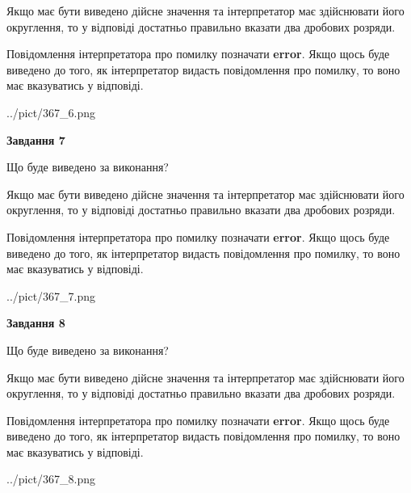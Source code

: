 \documentclass[12pt, ukrainian]{article}
\begin{document}
{\begin {Large}
Якщо має бути виведено дійсне значення та інтерпретатор має здійснювати його округлення, 
то у відповіді достатньо правильно вказати два дробових розряди.

Повідомлення інтерпретатора про помилку позначати \textbf{error}.
Якщо щось буде виведено до того, як інтерпретатор видасть повідомлення про помилку, 
то воно має вказуватись у відповіді. \par

\begin{center}
	{../pict/367_6.png}
\end{center}
\newpage

{\begin {center}\textbf{Завдання 7}\end {center}}\par
Що буде виведено за виконання? \par

Якщо має бути виведено дійсне значення та інтерпретатор має здійснювати його округлення, 
то у відповіді достатньо правильно вказати два дробових розряди.

Повідомлення інтерпретатора про помилку позначати \textbf{error}.
Якщо щось буде виведено до того, як інтерпретатор видасть повідомлення про помилку, 
то воно має вказуватись у відповіді. \par

\begin{center}
	{../pict/367_7.png}
\end{center}
\newpage

{\begin {center}\textbf{Завдання 8}\end {center}}\par
Що буде виведено за виконання? \par

Якщо має бути виведено дійсне значення та інтерпретатор має здійснювати його округлення, 
то у відповіді достатньо правильно вказати два дробових розряди.

Повідомлення інтерпретатора про помилку позначати \textbf{error}.
Якщо щось буде виведено до того, як інтерпретатор видасть повідомлення про помилку, 
то воно має вказуватись у відповіді. \par

\begin{center}
	{../pict/367_8.png}
\end{center}
\newpage


\end{Large}}
\end{document}
